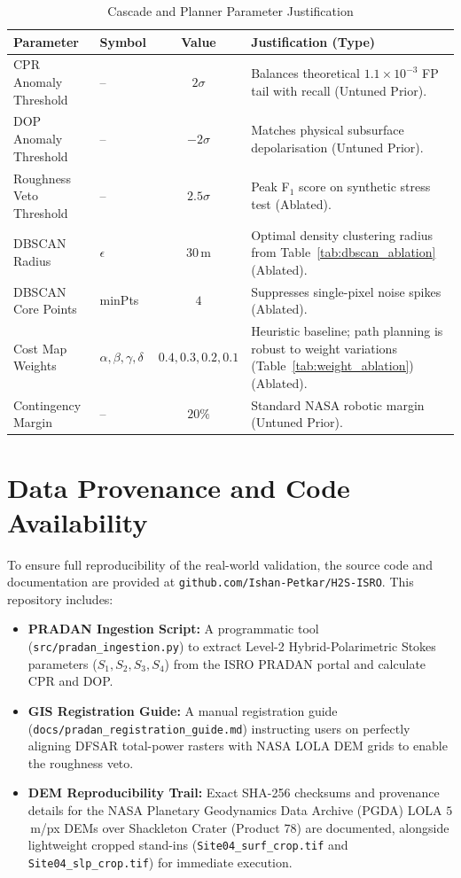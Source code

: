 \documentclass[10pt,conference]{IEEEtran}
\begin{document}
\begin{table}[htbp]
\caption{Cascade and Planner Parameter Justification}
\label{tab:param_justification}
\centering
\begin{tabular}{llcp{5cm}}
\toprule
Parameter & Symbol & Value & Justification (Type) \\
\midrule
CPR Anomaly Threshold & -- & $2\sigma$ & Balances theoretical $1.1 \times 10^{-3}$ FP tail with recall (Untuned Prior). \\
DOP Anomaly Threshold & -- & $-2\sigma$ & Matches physical subsurface depolarisation (Untuned Prior). \\
Roughness Veto Threshold & -- & $2.5\sigma$ & Peak F$_1$ score on synthetic stress test (Ablated). \\
DBSCAN Radius & $\epsilon$ & $30$\,m & Optimal density clustering radius from Table~\ref{tab:dbscan_ablation} (Ablated). \\
DBSCAN Core Points & minPts & $4$ & Suppresses single-pixel noise spikes (Ablated). \\
Cost Map Weights & $\alpha,\beta,\gamma,\delta$ & $0.4, 0.3, 0.2, 0.1$ & Heuristic baseline; path planning is robust to weight variations (Table~\ref{tab:weight_ablation}) (Ablated). \\
Contingency Margin & -- & $20\%$ & Standard NASA robotic margin (Untuned Prior). \\
\bottomrule
\end{tabular}
\end{table}

\section*{Data Provenance and Code Availability}

To ensure full reproducibility of the real-world validation, the source code and documentation are provided at \texttt{github.com/Ishan-Petkar/H2S-ISRO}. This repository includes:
\begin{itemize}
    \item \textbf{PRADAN Ingestion Script:} A programmatic tool (\texttt{src/pradan\_ingestion.py}) to extract Level-2 Hybrid-Polarimetric Stokes parameters ($S_1, S_2, S_3, S_4$) from the ISRO PRADAN portal and calculate CPR and DOP.
    \item \textbf{GIS Registration Guide:} A manual registration guide (\texttt{docs/pradan\_registration\_guide.md}) instructing users on perfectly aligning DFSAR total-power rasters with NASA LOLA DEM grids to enable the roughness veto.
    \item \textbf{DEM Reproducibility Trail:} Exact SHA-256 checksums and provenance details for the NASA Planetary Geodynamics Data Archive (PGDA) LOLA $5$\,m/px DEMs over Shackleton Crater (Product 78) are documented, alongside lightweight cropped stand-ins (\texttt{Site04\_surf\_crop.tif} and \texttt{Site04\_slp\_crop.tif}) for immediate execution.
\end{itemize}
\end{document}
